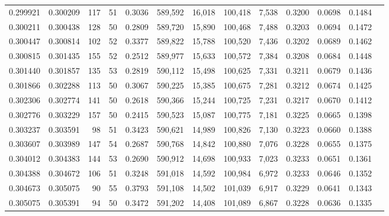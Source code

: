 \begin{tabular}{rrrrrrrrrrrrr}
0.299921 & 0.300209 &   117 &  51 &                                     0.3036 & 589,592 &  16,018 & 100,418 &   7,538 & 0.3200 & 0.0698 & 0.1484 \\
0.300211 & 0.300438 &   128 &  50 &                                     0.2809 & 589,720 &  15,890 & 100,468 &   7,488 & 0.3203 & 0.0694 & 0.1472 \\
0.300447 & 0.300814 &   102 &  52 &                                     0.3377 & 589,822 &  15,788 & 100,520 &   7,436 & 0.3202 & 0.0689 & 0.1462 \\
0.300815 & 0.301435 &   155 &  52 &                                     0.2512 & 589,977 &  15,633 & 100,572 &   7,384 & 0.3208 & 0.0684 & 0.1448 \\
0.301440 & 0.301857 &   135 &  53 &                                     0.2819 & 590,112 &  15,498 & 100,625 &   7,331 & 0.3211 & 0.0679 & 0.1436 \\
0.301866 & 0.302288 &   113 &  50 &                                     0.3067 & 590,225 &  15,385 & 100,675 &   7,281 & 0.3212 & 0.0674 & 0.1425 \\
0.302306 & 0.302774 &   141 &  50 &                                     0.2618 & 590,366 &  15,244 & 100,725 &   7,231 & 0.3217 & 0.0670 & 0.1412 \\
0.302776 & 0.303229 &   157 &  50 &                                     0.2415 & 590,523 &  15,087 & 100,775 &   7,181 & 0.3225 & 0.0665 & 0.1398 \\
0.303237 & 0.303591 &    98 &  51 &                                     0.3423 & 590,621 &  14,989 & 100,826 &   7,130 & 0.3223 & 0.0660 & 0.1388 \\
0.303607 & 0.303989 &   147 &  54 &                                     0.2687 & 590,768 &  14,842 & 100,880 &   7,076 & 0.3228 & 0.0655 & 0.1375 \\
0.304012 & 0.304383 &   144 &  53 &                                     0.2690 & 590,912 &  14,698 & 100,933 &   7,023 & 0.3233 & 0.0651 & 0.1361 \\
0.304388 & 0.304672 &   106 &  51 &                                     0.3248 & 591,018 &  14,592 & 100,984 &   6,972 & 0.3233 & 0.0646 & 0.1352 \\
0.304673 & 0.305075 &    90 &  55 &                                     0.3793 & 591,108 &  14,502 & 101,039 &   6,917 & 0.3229 & 0.0641 & 0.1343 \\
0.305075 & 0.305391 &    94 &  50 &                                     0.3472 & 591,202 &  14,408 & 101,089 &   6,867 & 0.3228 & 0.0636 & 0.1335 \\

\end{tabular}

